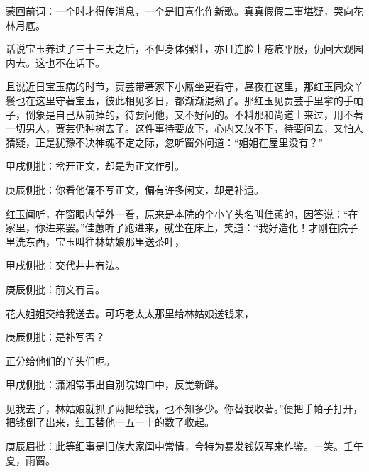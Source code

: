 \begin{parag}

    \begin{note}蒙回前词：一个时才得传消息，一个是旧喜化作新歌。真真假假二事堪疑，哭向花林月底。\end{note}
\end{parag}

\begin{parag}

    话说宝玉养过了三十三天之后，不但身体强壮，亦且连脸上疮痕平服，仍回大观园内去。这也不在话下。
\end{parag}


\begin{parag}


    且说近日宝玉病的时节，贾芸带著家下小厮坐更看守，昼夜在这里，那红玉同众丫鬟也在这里守著宝玉，彼此相见多日，都渐渐混熟了。那红玉见贾芸手里拿的手帕子，倒象是自己从前掉的，待要问他，又不好问的。不料那和尚道士来过，用不著一切男人，贾芸仍种树去了。这件事待要放下，心内又放不下，待要问去，又怕人猜疑，正是犹豫不决神魂不定之际，忽听窗外问道：“姐姐在屋里没有？”\begin{note}甲戌侧批：岔开正文，却是为正文作引。\end{note}\begin{note}庚辰侧批：你看他偏不写正文，偏有许多闲文，却是补遗。\end{note}红玉闻听，在窗眼内望外一看，原来是本院的个小丫头名叫佳蕙的，因答说：“在家里，你进来罢。”佳蕙听了跑进来，就坐在床上，笑道：“我好造化！才刚在院子里洗东西，宝玉叫往林姑娘那里送茶叶，\begin{note}甲戌侧批：交代井井有法。\end{note}\begin{note}庚辰侧批：前文有言。\end{note}花大姐姐交给我送去。可巧老太太那里给林姑娘送钱来，\begin{note}庚辰侧批：是补写否？\end{note}正分给他们的丫头们呢。\begin{note}甲戌侧批：潇湘常事出自别院婢口中，反觉新鲜。\end{note}见我去了，林姑娘就抓了两把给我，也不知多少。你替我收著。”便把手帕子打开，把钱倒了出来，红玉替他一五一十的数了收起。\begin{note}庚辰眉批：此等细事是旧族大家闺中常情，今特为暴发钱奴写来作鉴。一笑。壬午夏，雨窗。\end{note}
\end{parag}


